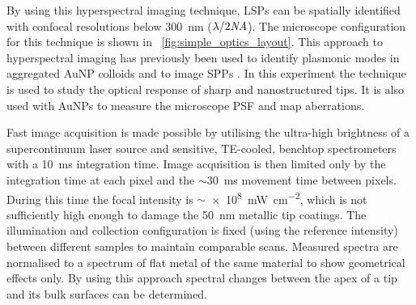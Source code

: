 \documentclass{article}
\begin{document}
By using this hyperspectral imaging technique, LSPs can be spatially identified with confocal resolutions below \SI{300}{nm} ($\lambda/2\mathit{NA}$). The microscope configuration for this technique is shown in \figurename~\ref{fig:simple_optics_layout}. This approach to hyperspectral imaging has previously been used to identify plasmonic modes in aggregated AuNP colloids \cite{herrmann2013} and to image SPPs \cite{bashevoy2007hyperspectral}. In this experiment the technique is used to study the optical response of sharp and nanostructured tips. It is also used with AuNPs to measure the microscope PSF and map aberrations.

Fast image acquisition is made possible by utilising the ultra-high brightness of a supercontinuum laser source and sensitive, TE-cooled, benchtop spectrometers with a \SI{10}{ms} integration time. Image acquisition is then limited only by the integration time at each pixel and the $\sim$\SI{30}{ms} movement time between pixels. During this time the focal intensity is $\sim$\SI{e8}{\milli\watt\per\centi\metre\squared}, which is not sufficiently high enough to damage the \SI{50}{nm} metallic tip coatings. The illumination and collection configuration is fixed (using the reference intensity) between different samples to maintain comparable scans. Measured spectra are normalised to a spectrum of flat metal of the same material to show geometrical effects only. By using this approach spectral changes between the apex of a tip and its bulk surfaces can be determined.
\end{document}
